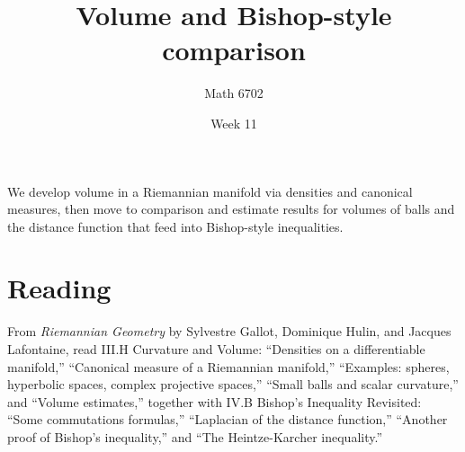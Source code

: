 \documentclass{article}
\title{Volume and Bishop-style comparison}
\author{Math 6702}
\date{Week 11}
\begin{document}
\maketitle

We develop volume in a Riemannian manifold via densities and canonical measures, then move to comparison and estimate results for volumes of balls and the distance function that feed into Bishop-style inequalities.

\section*{Reading}
From \textit{Riemannian Geometry} by Sylvestre Gallot, Dominique Hulin, and Jacques Lafontaine, read \textsection III.H Curvature and Volume: ``Densities on a differentiable manifold,'' ``Canonical measure of a Riemannian manifold,'' ``Examples: spheres, hyperbolic spaces, complex projective spaces,'' ``Small balls and scalar curvature,'' and ``Volume estimates,'' together with \textsection IV.B Bishop's Inequality Revisited: ``Some commutations formulas,'' ``Laplacian of the distance function,'' ``Another proof of Bishop's inequality,'' and ``The Heintze-Karcher inequality.''
\end{document}
